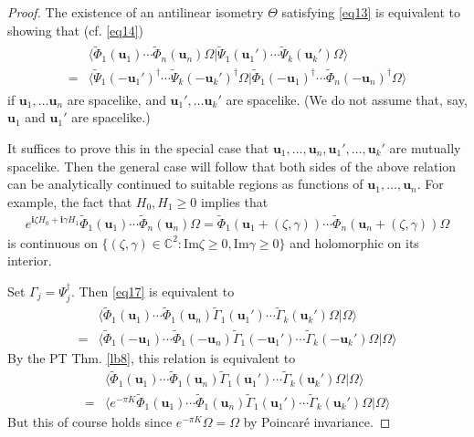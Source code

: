 \documentclass[12pt,b5paper,notitlepage]{article}
\theoremstyle{definition}
\theoremstyle{plain}
\newcommand{\wtd}{\widetilde}
\newcommand{\bk}[1]{\langle {#1}\rangle}
\newcommand{\im}{\mathbf{i}}
\newcommand{\Cbb}{\mathbb C}
\newcommand{\ubf}{\mathbf u}
\newcommand{\Imag}{\mathrm{Im}}
\numberwithin{equation}{section}
\begin{document}
\begin{proof}
The existence of an antilinear isometry $\Theta$ satisfying \eqref{eq13} is equivalent to showing that (cf. \eqref{eq14})
\begin{align*}
\begin{aligned}
&\bk{\wtd\Phi_1(\ubf_1)\cdots\wtd\Phi_n(\ubf_n)\Omega|\wtd\Psi_1(\ubf_1')\cdots\wtd\Psi_k(\ubf_k')\Omega}\\
=&\bk{\wtd\Psi_1(-\ubf_1')^\dagger\cdots\wtd\Psi_k(-\ubf_k')^\dagger\Omega|\wtd\Phi_1(-\ubf_1)^\dagger\cdots\wtd\Phi_n(-\ubf_n)^\dagger\Omega}
\end{aligned}\tag{$\star$}\label{eq17}
\end{align*} 
if $\ubf_1,\dots\ubf_n$ are spacelike, and $\ubf_1',\dots\ubf_k'$ are spacelike. (We do not assume that, say, $\ubf_1$ and $\ubf_1'$ are spacelike.)

It suffices to prove this in the special case that $\ubf_1,\dots,\ubf_n,\ubf_1',\dots,\ubf_k'$ are mutually spacelike. Then the general case will follow that both sides of the above relation can be analytically continued to suitable regions as functions of $\ubf_1,\dots,\ubf_n$. For example, the fact that $H_0,H_1\geq0$ implies that
\begin{align*}
e^{\im\zeta H_0+\im\gamma H_1}\wtd\Phi_1(\ubf_1)\cdots\wtd\Phi_n(\ubf_n)\Omega=\wtd\Phi_1(\ubf_1+(\zeta,\gamma))\cdots\wtd\Phi_n(\ubf_n+(\zeta,\gamma))\Omega
\end{align*}
is continuous on $\{(\zeta,\gamma)\in\Cbb^2:\Imag\zeta\geq0,\Imag\gamma\geq0\}$ and holomorphic on its interior.

Set $\Gamma_j=\Psi_j^\dagger$. Then \eqref{eq17} is equivalent to
\begin{align*}
&\bk{\wtd\Phi_1(\ubf_1)\cdots\wtd\Phi_1(\ubf_n)\wtd\Gamma_1(\ubf_1')\cdots\wtd\Gamma_k(\ubf_k')\Omega|\Omega}\\
=&\bk{\wtd\Phi_1(-\ubf_1)\cdots\wtd\Phi_1(-\ubf_n)\wtd\Gamma_1(-\ubf_1')\cdots\wtd\Gamma_k(-\ubf_k')\Omega|\Omega}
\end{align*}
By the PT Thm. \ref{lb8}, this relation is equivalent to
\begin{align*}
&\bk{\wtd\Phi_1(\ubf_1)\cdots\wtd\Phi_1(\ubf_n)\wtd\Gamma_1(\ubf_1')\cdots\wtd\Gamma_k(\ubf_k')\Omega|\Omega}\\
=&\bk{e^{-\pi K}\wtd\Phi_1(\ubf_1)\cdots\wtd\Phi_1(\ubf_n)\wtd\Gamma_1(\ubf_1')\cdots\wtd\Gamma_k(\ubf_k')\Omega|\Omega}
\end{align*}
But this of course holds since $e^{-\pi K}\Omega=\Omega$ by Poincar\'e invariance.
\end{proof}
\end{document}

